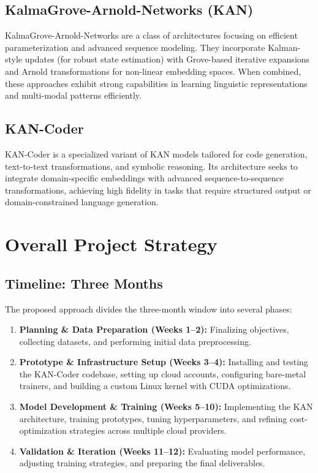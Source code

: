 \documentclass{article}
\begin{document}
\subsection{KalmaGrove-Arnold-Networks (KAN)}
KalmaGrove-Arnold-Networks are a class of architectures focusing on efficient parameterization and advanced sequence modeling. They incorporate Kalman-style updates (for robust state estimation) with Grove-based iterative expansions and Arnold transformations for non-linear embedding spaces. When combined, these approaches exhibit strong capabilities in learning linguistic representations and multi-modal patterns efficiently.

\subsection{KAN-Coder}
KAN-Coder is a specialized variant of KAN models tailored for code generation, text-to-text transformations, and symbolic reasoning. Its architecture seeks to integrate domain-specific embeddings with advanced sequence-to-sequence transformations, achieving high fidelity in tasks that require structured output or domain-constrained language generation.

\section{Overall Project Strategy}
\subsection{Timeline: Three Months}
The proposed approach divides the three-month window into several phases:
\begin{enumerate}
    \item \textbf{Planning \& Data Preparation (Weeks 1--2):} Finalizing objectives, collecting datasets, and performing initial data preprocessing.
    \item \textbf{Prototype \& Infrastructure Setup (Weeks 3--4):} Installing and testing the KAN-Coder codebase, setting up cloud accounts, configuring bare-metal trainers, and building a custom Linux kernel with CUDA optimizations.
    \item \textbf{Model Development \& Training (Weeks 5--10):} Implementing the KAN architecture, training prototypes, tuning hyperparameters, and refining cost-optimization strategies across multiple cloud providers.
    \item \textbf{Validation \& Iteration (Weeks 11--12):} Evaluating model performance, adjusting training strategies, and preparing the final deliverables.
\end{enumerate}
\end{document}
